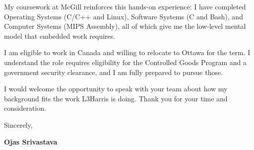 \documentclass[11pt]{article}
\begin{document}
My coursework at McGill reinforces this hands-on experience: I have completed Operating Systems (C/C++ and Linux), Software Systems (C and Bash), and Computer Systems (MIPS Assembly), all of which give me the low-level mental model that embedded work requires.

I am eligible to work in Canada and willing to relocate to Ottawa for the term. I understand the role requires eligibility for the Controlled Goods Program and a government security clearance, and I am fully prepared to pursue those.

I would welcome the opportunity to speak with your team about how my background fits the work L3Harris is doing. Thank you for your time and consideration.

\vspace{18pt}
Sincerely,

\vspace{24pt}
\textbf{Ojas Srivastava}
\end{document}

